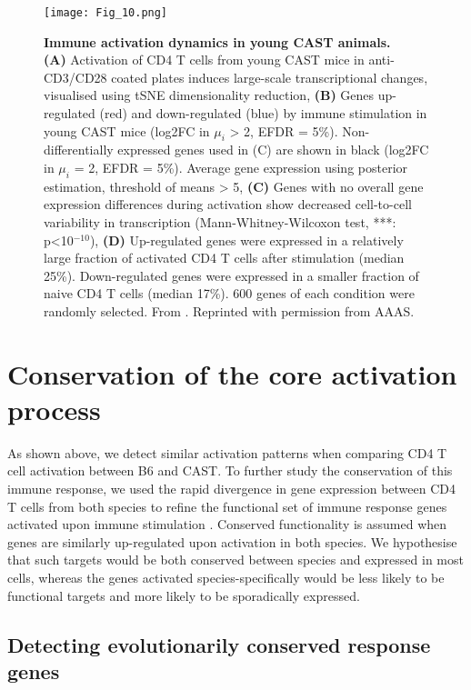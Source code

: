 \begin{figure}[!ht]
\centering
\texttt{[image: Fig\_10.png]}
\caption[Immune activation dynamics in young CAST animals]{\textbf{Immune activation dynamics in young CAST animals.}\\
\textbf{(A)} Activation of CD4\plus{} T cells from young CAST mice in anti-CD3\textepsilon{}/CD28 coated plates induces large-scale transcriptional changes, visualised using tSNE dimensionality reduction, \textbf{(B)} Genes up-regulated (red) and down-regulated (blue) by immune stimulation in young CAST mice (log2FC in $\mu_i$ > 2, EFDR = 5\%). Non-differentially expressed genes used in (C) are shown in black (log2FC in $\mu_i$ = 2, EFDR = 5\%). Average gene expression using posterior estimation, threshold of means > 5, \textbf{(C)} Genes with no overall gene expression differences during activation show decreased cell-to-cell variability in transcription (Mann-Whitney-Wilcoxon test, ***: p<10$^{-10}$), \textbf{(D)} Up-regulated genes were expressed in a relatively large fraction of activated CD4\plus{} T cells after stimulation (median 25\%). Down-regulated genes were expressed in a smaller fraction of naive CD4\plus{} T cells (median 17\%). 600 genes of each condition were randomly selected. From \citep{Martinez-jimenez2017}. Reprinted with permission from AAAS.}
\label{fig1:immune_activation_CAST}
\end{figure}

\newpage

\section{Conservation of the core activation process}

As shown above, we detect similar activation patterns when comparing CD4\plus{} T cell activation between B6 and CAST. To further study the conservation of this immune response, we used the rapid divergence in gene expression between CD4\plus{} T cells from both species to refine the functional set of immune response genes activated upon immune stimulation \citep{Shay2013}. Conserved functionality is assumed when genes are similarly up-regulated upon activation in both species. We hypothesise that such targets would be both conserved between species and expressed in most cells, whereas the genes activated species-specifically would be less likely to be functional targets and more likely to be sporadically expressed.

\subsection{Detecting evolutionarily conserved response genes}

